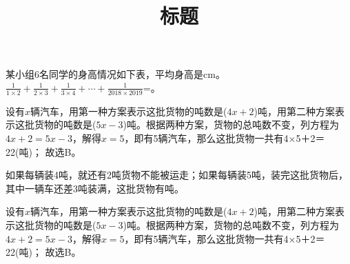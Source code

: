 \documentclass[answers]{BHCexam}
\begin{document}
\title{标题}



\date{}
\maketitle
\begin{groups}
\begin{questions}[p]
\question[] 某小组6名同学的身高情况如下表，平均身高是cm。\( \displaystyle \frac{1}{1\times 2}+\frac{1}{2\times 3}+\frac{1}{3\times 4}+\cdots +\frac{1}{2018\times 2019}\)=。 
\begin{solution}{4cm} 
\methodonly 设有\( x\)辆汽车，用第一种方案表示这批货物的吨数是(\( 4x+2\))吨，用第二种方案表示这批货物的吨数是(\( 5x-3\))吨。根据两种方案，货物的总吨数不变，列方程为\( 4x+2=5x-3\)，解得\( x=5\)，即有5辆汽车，那么这批货物一共有4×5＋2＝22(吨)； 故选B。 
\end{solution} 
\question[] 如果每辆装4吨，就还有2吨货物不能被运走；如果每辆装5吨，装完这批货物后，其中一辆车还差3吨装满，这批货物有吨。 
\begin{solution}{4cm} 
\methodonly 设有\( x\)辆汽车，用第一种方案表示这批货物的吨数是(\( 4x+2\))吨，用第二种方案表示这批货物的吨数是(\( 5x-3\))吨。根据两种方案，货物的总吨数不变，列方程为\( 4x+2=5x-3\)，解得\( x=5\)，即有5辆汽车，那么这批货物一共有4×5＋2＝22(吨)； 故选B。 
\end{solution} 
 
\end{questions}

\end{groups}
\end{document}
